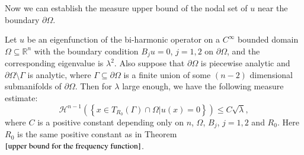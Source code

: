 \documentclass[a4paper, 12pt, onecolumn]{article} \textwidth 148mm
\begin{document}
Now we can establish the measure upper bound of the nodal set of $u$ near the boundary $\partial\Omega$.

\begin{theorem}\label{measure of nodal set near the boundary}
Let $u$ be an eigenfunction of the bi-harmonic operator on a $C^{\infty}$ bounded domain $\Omega\subseteq\mathbb{R}^n$ with the boundary condition $B_ju=0$, $j=1,2$ on $\partial\Omega$, and the corresponding eigenvalue is $\lambda^2$. Also suppose that $\partial\Omega$ is piecewise analytic and $\partial\Omega\setminus\Gamma$ is analytic, where $\Gamma\subseteq\partial\Omega$ is a finite union of some $(n-2)$ dimensional submanifolds of $\partial\Omega$. Then for $\lambda$ large enough, we have the following measure estimate:
\begin{equation}
\mathcal{H}^{n-1}\left(\left\{x\in T_{R_0}(\Gamma)\cap\Omega|u(x)=0\right\}\right)\leq C\sqrt{\lambda},
\end{equation}
where $C$ is a positive constant depending only on $n$, $\Omega$, $B_j$, $j=1,2$ and $R_0$. Here $R_0$ is the same positive constant as in Theorem $\ref{upper bound for the frequency function}$.
\end{theorem}
\end{document}
